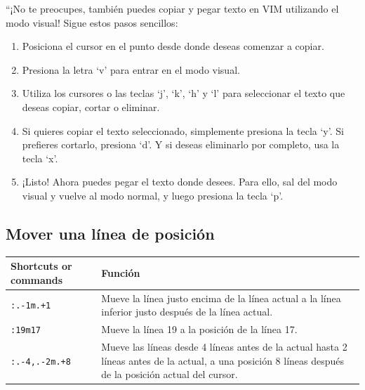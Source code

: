 \documentclass[
  doc,
  floatsintext,
  longtable,
  a4paper,
  nolmodern,
  notxfonts,
  notimes,
  12pt,
  colorlinks=true,linkcolor=blue,citecolor=blue,urlcolor=blue]{apa7}
\providecommand{\tightlist}{%
  \setlength{\itemsep}{0pt}\setlength{\parskip}{0pt}}
\newcounter{none} %
\begin{document}
``¡No te preocupes, también puedes copiar y pegar texto en VIM
utilizando el modo visual! Sigue estos pasos sencillos:

\begin{enumerate}
\def\labelenumi{\arabic{enumi}.}
\tightlist
\item
  Posiciona el cursor en el punto desde donde deseas comenzar a copiar.
\item
  Presiona la letra `v' para entrar en el modo visual.
\item
  Utiliza los cursores o las teclas `j', `k', `h' y `l' para seleccionar
  el texto que deseas copiar, cortar o eliminar.
\item
  Si quieres copiar el texto seleccionado, simplemente presiona la tecla
  `y'. Si prefieres cortarlo, presiona `d'. Y si deseas eliminarlo por
  completo, usa la tecla `x'.
\item
  ¡Listo! Ahora puedes pegar el texto donde desees. Para ello, sal del
  modo visual y vuelve al modo normal, y luego presiona la tecla `p'.
\end{enumerate}

\subsection{Mover una línea de
posición}\label{mover-una-luxednea-de-posiciuxf3n}

{\def\LTcaptype{none} %
\begin{longtable}[]{@{}
  >{\raggedright\arraybackslash}p{}
  >{\raggedright\arraybackslash}p{}@{}}
\toprule\noalign{}
\begin{minipage}[b]{\linewidth}\raggedright
Shortcuts or commands
\end{minipage} & \begin{minipage}[b]{\linewidth}\raggedright
Función
\end{minipage} \\
\midrule\noalign{}
\endhead
\bottomrule\noalign{}
\endlastfoot
\texttt{:.-1m.+1} & Mueve la línea justo encima de la línea actual a la
línea inferior justo después de la línea actual. \\
\texttt{:19m17} & Mueve la línea 19 a la posición de la línea 17. \\
\texttt{:.-4,.-2m.+8} & Mueve las líneas desde 4 líneas antes de la
actual hasta 2 líneas antes de la actual, a una posición 8 líneas
después de la posición actual del cursor. \\
\end{longtable}
}
\end{document}
